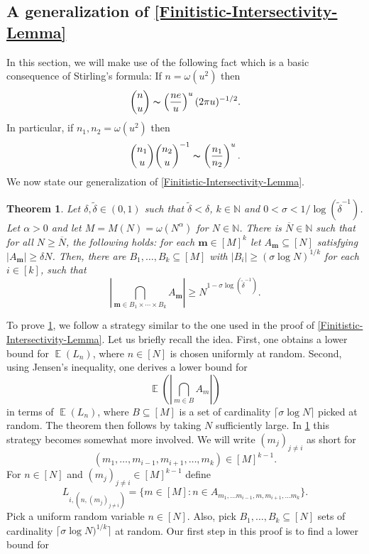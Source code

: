 \documentclass[letter, 11pt]{article}
\theoremstyle{plain} %
\newtheorem{theorem}{Theorem}[section]
\theoremstyle{definition} %
\theoremstyle{plain}
\theoremstyle{plain}
\newcommand{\N}{\mathbb{N}}
\newcommand{\1}{\mathbbm{1}}
\newcommand{\E}{\operatorname{\mathbb{E}}}
\begin{document}
\subsection{A generalization of \cref{Finitistic-Intersectivity-Lemma}}
In this section, we will make use of the following fact which is a basic consequence of Stirling's formula: If $n=\omega(u^2)$ then
$$\binom{n}{u}\thicksim \left(\frac{ne}{u}\right)^u  (2\pi u)^{-1/2}.$$
In particular, if $n_1,n_2=\omega(u^2)$ then 
\begin{equation}\label{estimate-binomial-coeff}
   \binom{n_1}{u}\binom{n_2}{u}^{-1}\thicksim \left(\frac{n_1}{n_2}\right)^u   . 
\end{equation}
We now state our generalization of \cref{Finitistic-Intersectivity-Lemma}.
 \begin{theorem}\label{FIL}
      Let $\delta,\tilde{\delta}\in (0,1)$ such that $\tilde{\delta}<\delta$, $k\in \N$ and $0<\sigma<1/\log{(\tilde{\delta}^{-1})}$. Let $\alpha>0$ and let $M=M(N) =\omega(N^\alpha)$ for $N\in \N$. There is $\overline{N}\in \N$ such that for all $N\geq \overline{N}$, the following holds: for each $\boldsymbol{m}\in [M]^{k}$ let $A_{\boldsymbol{m}}\subseteq [N]$ satisfying $|A_{\boldsymbol{m}}|\geq \delta N$. Then, there are $B_1,\ldots,B_{k}\subseteq [M] $ with $|B_i|\geq (\sigma \log{N})^{1/k}$ for each $i\in [k]$, such that 
        $$\left| \bigcap_{\boldsymbol{m}\in B_1\times \cdots \times B_{k}} A_{\boldsymbol{m}} \right| \geq N^{1-\sigma \log(\tilde{\delta}^{-1})}.$$
\end{theorem}
To prove \cref{FIL}, we follow a strategy similar to the one used in the proof of \cref{Finitistic-Intersectivity-Lemma}. Let us briefly recall the idea. First, one obtains a lower bound for $\E(L_n)$, where $n\in [N]$ is chosen uniformly at random. Second, using Jensen's inequality, one derives a lower bound for
$$\E\left( \left|\bigcap_{m\in B} A_m\right|\right) $$
in terms of $\E(L_n)$, where $B\subseteq [M]$ is a set of cardinality $\lceil\sigma \log{N}\rceil$ picked at random. The theorem then follows by taking $N$ sufficiently large. In \cref{FIL} this strategy becomes somewhat more involved. We will write $(m_j)_{j\neq i}$ as short for $$(m_1,\ldots,m_{i-1},m_{i+1},\ldots,m_k) \in [M]^{k-1}.$$
For $n\in [N]$ and $(m_j)_{j\neq i}\in [M]^{k-1}$ define
    $$L_{i,(n,(m_j)_{j\neq i})}=\{m\in [M] : n\in A_{m_1,\ldots m_{i-1}, m ,m_{i+1}, \ldots m_k}\}. $$
Pick a uniform random variable $n\in [N]$. Also, pick $B_1,\ldots,B_k\subseteq [N]$ sets of cardinality $\lceil\sigma \log{N})^{1/k}\rceil $ at random. Our first step in this proof is to find a lower bound for
\end{document}
